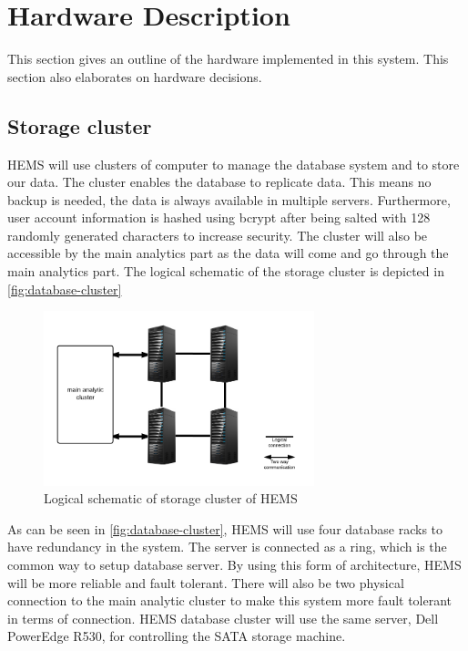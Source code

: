 \clearpage
\section{Hardware Description}
\label{sec:hardware-description}
This section gives an outline of the hardware implemented in this system. This section also elaborates on hardware decisions.

\subsection{Storage cluster}
\label{subsec:database-data}
HEMS will use clusters of computer to manage the database system and to store our data. The cluster enables the database to replicate data. This means no backup is needed, the data is always available in multiple servers. Furthermore, user account information is hashed using bcrypt after being salted with 128 randomly generated characters to increase security. The cluster will also be accessible by the main analytics part as the data will come and go through the main analytics part. The logical schematic of the storage cluster is depicted in \autoref{fig:database-cluster}

\begin{figure}[H]
\centering
\includegraphics[width=0.7\textwidth]{6-hardware/images/db-cluster.png}
\caption{Logical schematic of storage cluster of HEMS}
\label{fig:database-cluster}
\end{figure}

As can be seen in \autoref{fig:database-cluster}, HEMS will use four database racks to have redundancy in the system. The server is connected as a ring, which is the common way to setup database server. By using this form of architecture, HEMS will be more reliable and fault tolerant. There will also be two physical connection to the main analytic cluster to make this system more fault tolerant in terms of connection. HEMS database cluster will use the same server, Dell PowerEdge R530, for controlling the SATA storage machine.

